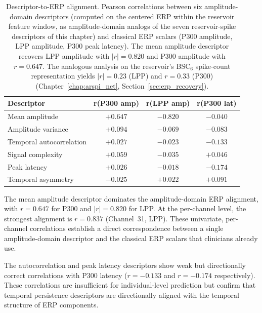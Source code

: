 \begin{table}[H]
\centering
\caption{Descriptor-to-ERP alignment. Pearson correlations between six amplitude-domain descriptors (computed on the centered ERP within the reservoir feature window, as amplitude-domain analogs of the seven reservoir-spike descriptors of this chapter) and classical ERP scalars (P300 amplitude, LPP amplitude, P300 peak latency). The mean amplitude descriptor recovers LPP amplitude with $|r| = 0.820$ and P300 amplitude with $r = 0.647$. The analogous analysis on the reservoir's BSC$_6$ spike-count representation yields $|r| = 0.23$ (LPP) and $r = 0.33$ (P300) (Chapter~\ref{chap:arspi_net}, Section~\ref{sec:erp_recovery}).}
\label{tab:descriptor_erp}
\begin{tabular}{lccc}
\toprule
\textbf{Descriptor} & \textbf{r(P300 amp)} & \textbf{r(LPP amp)} & \textbf{r(P300 lat)} \\
\midrule
Mean amplitude        & $+0.647$ & $-0.820$ & $-0.040$ \\
Amplitude variance    & $+0.094$ & $-0.069$ & $-0.083$ \\
Temporal autocorrelation & $+0.027$ & $-0.023$ & $-0.133$ \\
Signal complexity     & $+0.059$ & $-0.035$ & $+0.046$ \\
Peak latency          & $+0.026$ & $-0.018$ & $-0.174$ \\
Temporal asymmetry    & $-0.025$ & $+0.022$ & $+0.091$ \\
\bottomrule
\end{tabular}
\end{table}

The mean amplitude descriptor dominates the amplitude-domain ERP alignment, with $r = 0.647$ for P300 and $|r| = 0.820$ for LPP. At the per-channel level, the strongest alignment is $r = 0.837$ (Channel~31, LPP). These univariate, per-channel correlations establish a direct correspondence between a single amplitude-domain descriptor and the classical ERP scalars that clinicians already use.

The autocorrelation and peak latency descriptors show weak but directionally correct correlations with P300 latency ($r = -0.133$ and $r = -0.174$ respectively). These correlations are insufficient for individual-level prediction but confirm that temporal persistence descriptors are directionally aligned with the temporal structure of ERP components.

